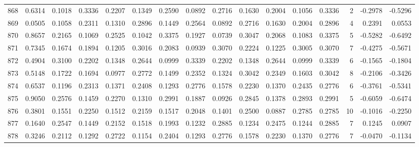 \begin{tabular}{lrrrrrrrrrrrrrrr}
868 &      0.6314 &  0.1018 &  0.3336 &  0.2207 &  0.1349 &  0.2590 &  0.0892 &  0.2716 &  0.1630 &  0.2004 &   0.1056 &     0.3336 &      2 &                   -0.2978 &                    -0.5296 \\
869 &      0.0505 &  0.1058 &  0.2311 &  0.1310 &  0.2896 &  0.1449 &  0.2564 &  0.0892 &  0.2716 &  0.1630 &   0.2004 &     0.2896 &      4 &                    0.2391 &                     0.0553 \\
870 &      0.8657 &  0.2165 &  0.1069 &  0.2525 &  0.1042 &  0.3375 &  0.1927 &  0.0739 &  0.3047 &  0.2068 &   0.1083 &     0.3375 &      5 &                   -0.5282 &                    -0.6492 \\
871 &      0.7345 &  0.1674 &  0.1894 &  0.1205 &  0.3016 &  0.2083 &  0.0939 &  0.3070 &  0.2224 &  0.1225 &   0.3005 &     0.3070 &      7 &                   -0.4275 &                    -0.5671 \\
872 &      0.4904 &  0.3100 &  0.2202 &  0.1348 &  0.2644 &  0.0999 &  0.3339 &  0.2202 &  0.1348 &  0.2644 &   0.0999 &     0.3339 &      6 &                   -0.1565 &                    -0.1804 \\
873 &      0.5148 &  0.1722 &  0.1694 &  0.0977 &  0.2772 &  0.1499 &  0.2352 &  0.1324 &  0.3042 &  0.2349 &   0.1603 &     0.3042 &      8 &                   -0.2106 &                    -0.3426 \\
874 &      0.6537 &  0.1196 &  0.2313 &  0.1371 &  0.2408 &  0.1293 &  0.2776 &  0.1578 &  0.2230 &  0.1370 &   0.2435 &     0.2776 &      6 &                   -0.3761 &                    -0.5341 \\
875 &      0.9050 &  0.2576 &  0.1459 &  0.2270 &  0.1310 &  0.2991 &  0.1887 &  0.0926 &  0.2845 &  0.1378 &   0.2893 &     0.2991 &      5 &                   -0.6059 &                    -0.6474 \\
876 &      0.3801 &  0.1551 &  0.2250 &  0.1512 &  0.2159 &  0.1517 &  0.2048 &  0.1401 &  0.2500 &  0.0887 &   0.2785 &     0.2785 &     10 &                   -0.1016 &                    -0.2250 \\
877 &      0.1640 &  0.2547 &  0.1449 &  0.2152 &  0.1518 &  0.1993 &  0.1232 &  0.2885 &  0.1234 &  0.2475 &   0.1244 &     0.2885 &      7 &                    0.1245 &                     0.0907 \\
878 &      0.3246 &  0.2112 &  0.1292 &  0.2722 &  0.1154 &  0.2404 &  0.1293 &  0.2776 &  0.1578 &  0.2230 &   0.1370 &     0.2776 &      7 &                   -0.0470 &                    -0.1134 \\

\end{tabular}
